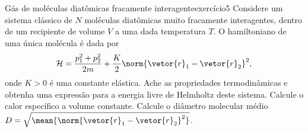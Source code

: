 \begin{exercício}{Gás de moléculas diatômicas fracamente interagente}{exercício5}
    Considere um sistema clássico de \(N\) moléculas diatômicas muito fracamente interagentes, dentro de um recipiente de volume \(V\) a uma dada temperatura \(T\). O hamiltoniano de uma única molécula é dada por
    \begin{equation*}
        \mathcal{H} = \frac{p_1^2 + p_2^2}{2m} + \frac{K}{2}\norm{\vetor{r}_1 - \vetor{r}_2}^2,
    \end{equation*}
    onde \(K > 0\) é uma constante elástica. Ache as propriedades termodinâmicas e obtenha uma expressão para a energia livre de Helmholtz deste sistema. Calcule o calor específico a volume constante. Calcule o diâmetro molecular médio \(D = \sqrt{\mean{\norm{\vetor{r}_1 - \vetor{r}_2}^2}}\).
\end{exercício}
